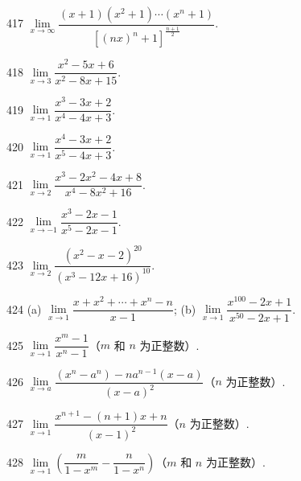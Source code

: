 \begin{prob}[S]{417}
$\lim\limits_{x \to \infty} \dfrac{(x + 1)(x^2 + 1)\cdots(x^n + 1)}{[(nx)^n + 1]^{\frac{n+1}{2}}}$.
\end{prob}

\begin{prob}[S]{418}
$\lim\limits_{x \to 3} \dfrac{x^2 - 5x + 6}{x^2 - 8x + 15}$.
\end{prob}

\begin{prob}[S]{419}
$\lim\limits_{x \to 1} \dfrac{x^3 - 3x + 2}{x^4 - 4x + 3}$.
\end{prob}

\begin{prob}[S]{420}
$\lim\limits_{x \to 1} \dfrac{x^4 - 3x + 2}{x^5 - 4x + 3}$.
\end{prob}

\begin{prob}[S]{421}
$\lim\limits_{x \to 2} \dfrac{x^3 - 2x^2 - 4x + 8}{x^4 - 8x^2 + 16}$.
\end{prob}

\begin{prob}[S]{422}
$\lim\limits_{x \to -1} \dfrac{x^3 - 2x - 1}{x^5 - 2x - 1}$.
\end{prob}

\begin{prob}[S]{423}
$\lim\limits_{x \to 2} \dfrac{(x^2 - x - 2)^{20}}{(x^3 - 12x + 16)^{10}}$.
\end{prob}

\begin{prob}[M]{424}
(a) $\lim\limits_{x \to 1} \dfrac{x + x^2 + \cdots + x^n - n}{x - 1}$; \qquad (b) $\lim\limits_{x \to 1} \dfrac{x^{100} - 2x + 1}{x^{50} - 2x + 1}$.
\end{prob}

\begin{prob}[S]{425}
$\lim\limits_{x \to 1} \dfrac{x^m - 1}{x^n - 1}$（$m$ 和 $n$ 为正整数）.
\end{prob}

\begin{prob}[S]{426}
$\lim\limits_{x \to a} \dfrac{(x^n - a^n) - na^{n-1}(x - a)}{(x - a)^2}$（$n$ 为正整数）.
\end{prob}

\begin{prob}[S]{427}
$\lim\limits_{x \to 1} \dfrac{x^{n+1} - (n + 1)x + n}{(x - 1)^2}$（$n$ 为正整数）.
\end{prob}

\begin{prob}[S]{428}
$\lim\limits_{x \to 1} \left(\dfrac{m}{1 - x^m} - \dfrac{n}{1 - x^n}\right)$（$m$ 和 $n$ 为正整数）.
\end{prob}

